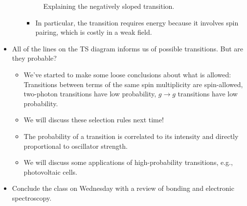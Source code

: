 \documentclass[../notes.tex]{subfiles}
\begin{document}
\begin{itemize}
\begin{itemize}
\begin{figure}[h!]
            \caption{Explaining the negatively sloped transition.}
            \label{fig:transNegSlope}
        \end{figure}
        \begin{itemize}
            \item In particular, the transition requires energy because it involves spin pairing, which is costly in a weak field.
        \end{itemize}
    \end{itemize}
    \item All of the lines on the TS diagram informs us of possible transitions. But are they probable?
    \begin{itemize}
        \item We've started to make some loose conclusions about what is allowed: Transitions between terms of the same spin multiplicity are spin-allowed, two-photon transitions have low probability, $g\to g$ transitions have low probability.
        \item We will discuss these selection rules next time!
        \item The probability of a transition is correlated to its intensity and directly proportional to oscillator strength.
        \item We will discuss some applications of high-probability transitions, e.g., photovoltaic cells.
    \end{itemize}
    \item Conclude the class on Wednesday with a review of bonding and electronic spectroscopy.
\end{itemize}
\end{document}

